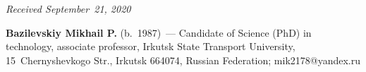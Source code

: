 \vspace*{-3pt}

  \hfill{\small\textit{Received September~21, 2020}}




\Contrl

\noindent
\textbf{Bazilevskiy Mikhail P.} (b.\ 1987)~--- Candidate of Science (PhD) in 
technology, associate professor, Irkutsk State Transport University, 
15~Chernyshevkogo Str., Irkutsk 664074, Russian Federation; 
\mbox{mik2178@yandex.ru}

\label{end\stat}

\renewcommand{\bibname}{\protect\rm Литература}